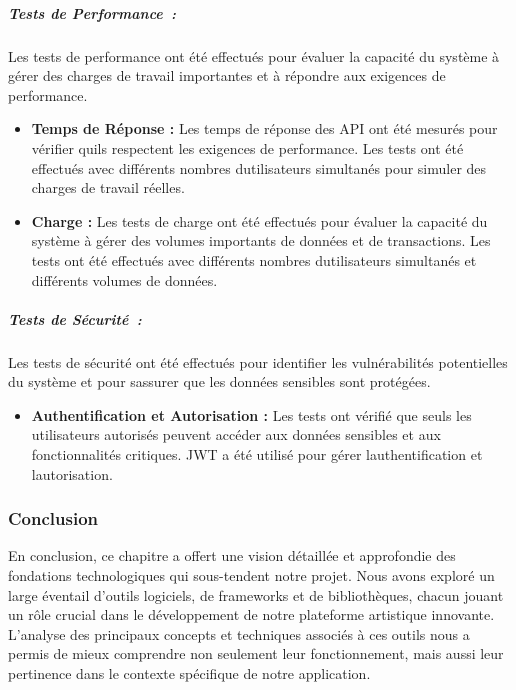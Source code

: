 \documentclass[12pt,a4paper,twoside]{report}
\begin{document}
\hypertarget{tests-de-performance}{%
\subparagraph{Tests de Performance~:}\label{tests-de-performance}}

Les tests de performance ont été effectués pour évaluer la capacité du
système à gérer des charges de travail importantes et à répondre aux
exigences de performance.

\begin{itemize}
\item
  \textbf{Temps de Réponse :} Les temps de réponse des API ont été
  mesurés pour vérifier qu\textquotesingle ils respectent les exigences
  de performance. Les tests ont été effectués avec différents nombres
  d\textquotesingle utilisateurs simultanés pour simuler des charges de
  travail réelles.
\item
  \textbf{Charge :} Les tests de charge ont été effectués pour évaluer
  la capacité du système à gérer des volumes importants de données et de
  transactions. Les tests ont été effectués avec différents nombres
  d\textquotesingle utilisateurs simultanés et différents volumes de
  données.
\end{itemize}

\hypertarget{tests-de-suxe9curituxe9}{%
\subparagraph{Tests de Sécurité~:}\label{tests-de-suxe9curituxe9}}

Les tests de sécurité ont été effectués pour identifier les
vulnérabilités potentielles du système et pour s\textquotesingle assurer
que les données sensibles sont protégées.

\begin{itemize}
\item
  \textbf{Authentification et Autorisation :} Les tests ont vérifié que
  seuls les utilisateurs autorisés peuvent accéder aux données sensibles
  et aux fonctionnalités critiques. JWT a été utilisé pour gérer
  l\textquotesingle authentification et l\textquotesingle autorisation.
\end{itemize}

\hypertarget{conclusion-3}{%
\subsubsection{\texorpdfstring{\textbf{Conclusion}~}{Conclusion~}}\label{conclusion-3}}

En conclusion, ce chapitre a offert une vision détaillée et approfondie
des fondations technologiques qui sous-tendent notre projet. Nous avons
exploré un large éventail d'outils logiciels, de frameworks et de
bibliothèques, chacun jouant un rôle crucial dans le développement de
notre plateforme artistique innovante. L'analyse des principaux concepts
et techniques associés à ces outils nous a permis de mieux comprendre
non seulement leur fonctionnement, mais aussi leur pertinence dans le
contexte spécifique de notre application.
\end{document}
